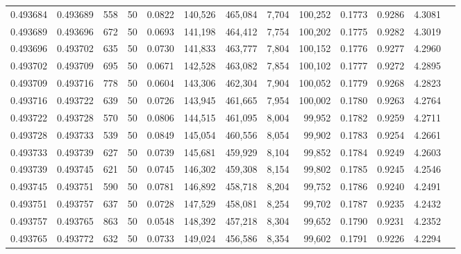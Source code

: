 \begin{tabular}{rrrrrrrrrrrrr}
0.493684 & 0.493689 &   558 &  50 &                                     0.0822 & 140,526 & 465,084 &   7,704 & 100,252 & 0.1773 & 0.9286 & 4.3081 \\
0.493689 & 0.493696 &   672 &  50 &                                     0.0693 & 141,198 & 464,412 &   7,754 & 100,202 & 0.1775 & 0.9282 & 4.3019 \\
0.493696 & 0.493702 &   635 &  50 &                                     0.0730 & 141,833 & 463,777 &   7,804 & 100,152 & 0.1776 & 0.9277 & 4.2960 \\
0.493702 & 0.493709 &   695 &  50 &                                     0.0671 & 142,528 & 463,082 &   7,854 & 100,102 & 0.1777 & 0.9272 & 4.2895 \\
0.493709 & 0.493716 &   778 &  50 &                                     0.0604 & 143,306 & 462,304 &   7,904 & 100,052 & 0.1779 & 0.9268 & 4.2823 \\
0.493716 & 0.493722 &   639 &  50 &                                     0.0726 & 143,945 & 461,665 &   7,954 & 100,002 & 0.1780 & 0.9263 & 4.2764 \\
0.493722 & 0.493728 &   570 &  50 &                                     0.0806 & 144,515 & 461,095 &   8,004 &  99,952 & 0.1782 & 0.9259 & 4.2711 \\
0.493728 & 0.493733 &   539 &  50 &                                     0.0849 & 145,054 & 460,556 &   8,054 &  99,902 & 0.1783 & 0.9254 & 4.2661 \\
0.493733 & 0.493739 &   627 &  50 &                                     0.0739 & 145,681 & 459,929 &   8,104 &  99,852 & 0.1784 & 0.9249 & 4.2603 \\
0.493739 & 0.493745 &   621 &  50 &                                     0.0745 & 146,302 & 459,308 &   8,154 &  99,802 & 0.1785 & 0.9245 & 4.2546 \\
0.493745 & 0.493751 &   590 &  50 &                                     0.0781 & 146,892 & 458,718 &   8,204 &  99,752 & 0.1786 & 0.9240 & 4.2491 \\
0.493751 & 0.493757 &   637 &  50 &                                     0.0728 & 147,529 & 458,081 &   8,254 &  99,702 & 0.1787 & 0.9235 & 4.2432 \\
0.493757 & 0.493765 &   863 &  50 &                                     0.0548 & 148,392 & 457,218 &   8,304 &  99,652 & 0.1790 & 0.9231 & 4.2352 \\
0.493765 & 0.493772 &   632 &  50 &                                     0.0733 & 149,024 & 456,586 &   8,354 &  99,602 & 0.1791 & 0.9226 & 4.2294 \\

\end{tabular}

